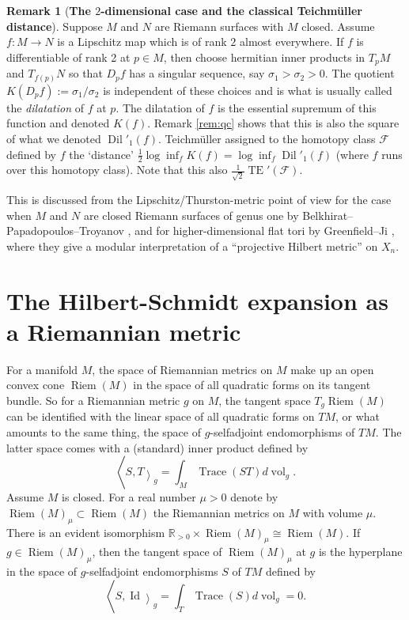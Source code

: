 \documentclass[11pt,letterpaper]{amsart}
\theoremstyle{definition}
\numberwithin{equation}{section}
\theoremstyle{definition}
\newtheorem{remark}[theorem]{Remark}
\newcommand{\Fc}{\mathcal{F}}
\newcommand{\Rb}{\mathbb{R}}
\DeclareMathOperator{\Id}{Id}
\DeclareMathOperator{\tr}{Trace}
\DeclareMathOperator{\Riem}{Riem}
\DeclareMathOperator{\la}{\langle}
\DeclareMathOperator{\ra}{\rangle}
\DeclareMathOperator{\TE}{TE}
\newcommand{\Dil}{\operatorname{Dil}}
\newcommand{\vol}{\operatorname{vol}}
\begin{document}
\begin{remark}[{\bf The $2$-dimensional case and the classical Teichm\"uller distance}]
\label{remark:2dcase}
Suppose $M$ and $N$ are Riemann surfaces with $M$ closed. 
Assume $f:M\to N$ is a Lipschitz map which is of rank $2$ almost everywhere.
If  $f$ is differentiable of rank 2 at $p\in M$, then  choose hermitian inner products  in $T_pM$ and $T_{f(p)}N$ so that  $D_pf$ has a singular sequence, say  $\sigma_1>\sigma_2>0$. The quotient $K(D_pf):=\sigma_1/\sigma_2$ is independent of these  choices and is what is usually called the {\em dilatation} of $f$ at $p$. The dilatation of $f$ is the  essential supremum of this function and denoted $K(f)$. Remark \ref{rem:qc}  shows that this is also the square of what we denoted $\Dil'_1(f)$.
Teichm\"uller assigned to the homotopy class $\Fc$ defined by $f$ the `distance'  $\frac{1}{2}\log\inf_f K(f)=\log \inf_f\Dil'_1(f)$ (where $f$ runs over this  homotopy class). Note that this also 
$\frac{1}{\sqrt{2}}\TE'(\Fc)$.

This  is discussed from the Lipschitz/Thurston-metric point of view for the case when $M$ and $N$ are closed Riemann surfaces of genus one by Belkhirat--Papadopoulos--Troyanov \cite{BPT05}, and for higher-dimensional
flat tori by Greenfield--Ji \cite{GreenfieldJi21}, where they give a modular interpretation of 
a ``projective Hilbert metric'' on $X_n$. 
\end{remark}

\section{The Hilbert-Schmidt expansion as a Riemannian metric}
\label{section:HSP}

For a manifold  $M$,  the space of Riemannian metrics on $M$ make up an open convex cone $\Riem(M)$ in the space of all  quadratic forms on its tangent bundle. So for a Riemannian metric $g$ on $M$, the tangent space $T_g\Riem(M)$ can be identified 
with the linear space of all quadratic forms on $TM$, or what amounts to the same thing, the space of $g$-selfadjoint endomorphisms of $TM$. The latter  space comes with a (standard) inner product defined by 
\[
\textstyle \la S, T\ra_g =\int_M \tr(ST)d\!\vol_g.
\]
Assume  $M$ is closed. For a real number $\mu>0$ denote by  $\Riem(M)_\mu\subset \Riem(M)$ the  Riemannian metrics on $M$ with volume $\mu$.
There is an evident isomorphism $\Rb_{>0}\times \Riem(M)_\mu\cong\Riem(M)$.
If $g\in \Riem(M)_\mu$, then the  tangent space of  $\Riem(M)_\mu$ at $g$ is  the hyperplane in the space of $g$-selfadjoint endomorphisms $S$ of $TM$ defined by 
\[
\textstyle \la S, \Id\ra_g=\int_T \tr(S)d\!\vol_g=0.
\]
\end{document}
